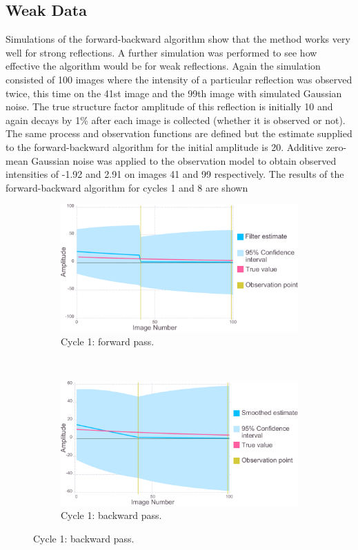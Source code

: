 \subsection{Weak Data}
\label{sub:Weak Data}
Simulations of the forward-backward algorithm show that the method works very well for strong reflections.
A further simulation was performed to see how effective the algorithm would be for weak reflections.
Again the simulation consisted of 100 images where the intensity of a particular reflection was observed twice, this time on the 41st image and the 99th image with simulated Gaussian noise.
The true structure factor amplitude of this reflection is initially 10 and again decays by 1\% after each image is collected (whether it is observed or not).
The same process and observation functions are defined but the estimate supplied to the forward-backward algorithm for the initial amplitude is 20.
Additive zero-mean Gaussian noise was applied to the observation model to obtain observed intensities of -1.92 and 2.91 on images 41 and 99 respectively.
The results of the forward-backward algorithm for cycles 1 and 8 are shown
\begin{figure}
    \ContinuedFloat
    \begin{subfigure}[b]{1.0\textwidth}
        \centering
        \includegraphics[width=\textwidth]{figures/datared/intDecSim_Filt1_bad.pdf}
        \caption{Cycle 1: forward pass.}
        \label{fig:UKF simulation results - cycle 1 - bad}
    \end{subfigure}
    \\
    \begin{subfigure}[b]{1.0\textwidth}
        \centering
        \includegraphics[width=\textwidth]{figures/datared/intDecSim1_bad.pdf}
        \caption{Cycle 1: backward pass.}
        \label{fig:URTSS simulation results - cycle 1 - bad}
    \end{subfigure}
\end{figure}

